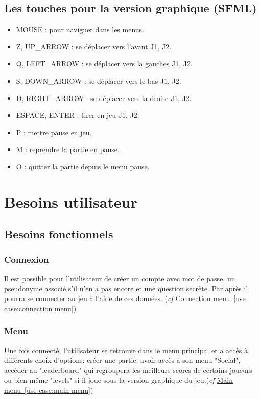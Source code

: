 \documentclass[french]{article}
\begin{document}
\subsection {Les touches pour la version graphique (SFML)}
\begin{itemize}
    \item MOUSE           : pour naviguer dans les menus.
    \item Z, UP\_ARROW    : se déplacer vers l'avant J1, J2.
    \item Q, LEFT\_ARROW  : se déplacer vers la gauches J1, J2.
    \item S, DOWN\_ARROW  : se déplacer vers le bas J1, J2.
    \item D, RIGHT\_ARROW : se déplacer vers la droite J1, J2.
    \item ESPACE, ENTER   : tirer en jeu J1, J2.
    \item P               : mettre pause en jeu.
    \item M               : reprendre la partie en pause.
    \item O               : quitter la partie depuis le menu pause.
\end{itemize}

\section{Besoins utilisateur}
\subsection {Besoins fonctionnels}
\subsubsection{Connexion} Il est possible pour l'utilisateur de créer un compte avec mot de passe, un pseudonyme associé s'il n'en a pas encore et une question secrète. Par après il pourra se connecter au jeu à l'aide de ces données. (\textit{cf} \hyperref[use case:connection menu]{Connection menu~\ref*{use case:connection menu}})

\label{besoin-user : menu}
\subsubsection{Menu} Une fois connecté, l'utilisateur se retrouve dans le menu principal et a accès à différents choix d'options: créer une partie, avoir accès à son menu "Social", accéder au "leaderboard" qui regroupera les meilleurs scores de certains joueurs ou bien même "levels" si il joue sous la version graphique du jeu.(\textit{cf} \hyperref[use case:main menu]{Main menu~\ref*{use case:main menu}})
\end{document}
